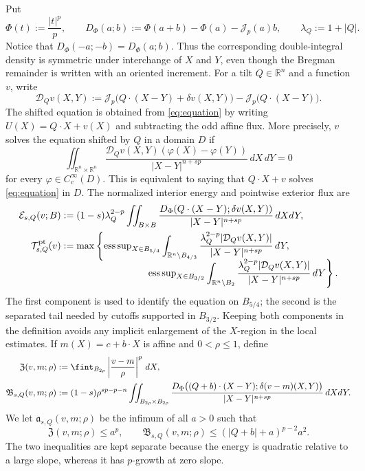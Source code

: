 \documentclass[11pt,reqno]{amsart}
\numberwithin{equation}{section}
\newcommand{\R}{\mathbb R}
\newcommand{\Jp}{\mathcal J_p}
\newcommand{\dd}{\,d}
\theoremstyle{remark}
\begin{document}
Put
\[
 \Phi(t):=\frac{|t|^p}{p},\qquad
 D_\Phi(a;b):=\Phi(a+b)-\Phi(a)-\Jp(a)b,
 \qquad \lambda_Q:=1+|Q|.
\]
Notice that \(D_\Phi(-a;-b)=D_\Phi(a;b)\).  Thus the corresponding
double-integral density is symmetric under interchange of \(X\) and
\(Y\), even though the Bregman remainder is written with an oriented
increment.
For a tilt \(Q\in\R^n\) and a function \(v\), write
\begin{equation*}
 \mathcal D_Qv(X,Y):=
 \Jp\bigl(Q\cdot(X-Y)+\delta v(X,Y)\bigr)
 -\Jp\bigl(Q\cdot(X-Y)\bigr).
\end{equation*}
The shifted equation is obtained from \eqref{eq:equation} by writing
\(U(X)=Q\cdot X+v(X)\) and subtracting the odd affine flux.  More
precisely, \(v\) solves the equation shifted by \(Q\) in a domain \(D\)
if
\begin{equation*}
 \iint_{\R^n\times\R^n}
 \frac{\mathcal D_Qv(X,Y)(\varphi(X)-\varphi(Y))}
 {|X-Y|^{n+sp}}\dd X\!\dd Y=0
\end{equation*}
for every \(\varphi\in C_c^\infty(D)\).  This is equivalent to saying
that \(Q\cdot X+v\) solves \eqref{eq:equation} in \(D\).  The normalized
interior energy and pointwise exterior flux are
\begin{align}
 \mathcal E_{s,Q}(v;B)
 &:=(1-s)\lambda_Q^{2-p}
 \iint_{B\times B}
 \frac{D_\Phi(Q\cdot(X-Y);\delta v(X,Y))}
 {|X-Y|^{n+sp}}\dd X\!\dd Y,
 \notag\\
 \mathcal T^{\rm pt}_{s,Q}(v)
 &:=\max\left\{
 {\operatorname*{ess\,sup}}_{X\in B_{5/4}}
 \int_{\R^n\setminus B_{4/3}}
 \frac{\lambda_Q^{2-p}|\mathcal D_Qv(X,Y)|}
 {|X-Y|^{n+sp}}\dd Y,
 \right.\notag\\[-2mm]
 &\hspace{31mm}\left.
 {\operatorname*{ess\,sup}}_{X\in B_{3/2}}
 \int_{\R^n\setminus B_2}
 \frac{\lambda_Q^{2-p}|\mathcal D_Qv(X,Y)|}
 {|X-Y|^{n+sp}}\dd Y\right\}.
 \label{eq:large-slope-pointwise-tail}
\end{align}
The first component is used to identify the equation on \(B_{5/4}\);
the second is the separated tail needed by cutoffs supported in
\(B_{3/2}\).  Keeping both components in the definition avoids any
implicit enlargement of the \(X\)-region in the local estimates.
If \(m(X)=c+b\cdot X\) is affine and \(0<\rho\le1\), define
\begin{align}
 \mathfrak Z(v,m;\rho)
 &:={\fint}_{B_{2\rho}}
 \left|\frac{v-m}{\rho}\right|^p\dd X,
 \label{eq:block-zero-modular}\\
 \mathfrak B_{s,Q}(v,m;\rho)
 &:=(1-s)\rho^{sp-p-n}
 \iint_{B_{2\rho}\times B_{2\rho}}
 \frac{D_\Phi\bigl((Q+b)\cdot(X-Y);
              \delta(v-m)(X,Y)\bigr)}
 {|X-Y|^{n+sp}}\dd X\!\dd Y.\notag
\end{align}
We let \(\mathfrak a_{s,Q}(v,m;\rho)\) be the infimum of all \(a>0\)
such that
\begin{equation}
 \mathfrak Z(v,m;\rho)\le a^p,\qquad
 \mathfrak B_{s,Q}(v,m;\rho)
 \le (|Q+b|+a)^{p-2}a^2.
 \label{eq:block-intrinsic-amplitude}
\end{equation}
The two inequalities are kept separate because the energy is quadratic
relative to a large slope, whereas it has \(p\)-growth at zero slope.
\end{document}
